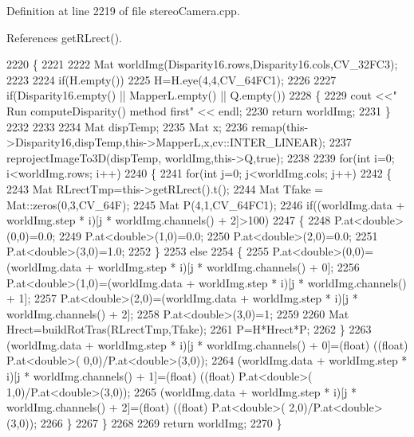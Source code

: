 Definition at line 2219 of file stereo\+Camera.\+cpp.



References get\+R\+Lrect().


\begin{DoxyCode}
2220 \{
2221 
2222     Mat worldImg(Disparity16.rows,Disparity16.cols,CV\_32FC3);
2223 
2224     \textcolor{keywordflow}{if}(H.empty())
2225         H=H.eye(4,4,CV\_64FC1);
2226 
2227     \textcolor{keywordflow}{if}(Disparity16.empty() || MapperL.empty() || Q.empty())
2228     \{
2229         cout <<\textcolor{stringliteral}{" Run computeDisparity() method first"} << endl;
2230         \textcolor{keywordflow}{return} worldImg;
2231     \}
2232 
2233 
2234     Mat dispTemp;
2235     Mat x;
2236     remap(this->Disparity16,dispTemp,this->MapperL,x,cv::INTER\_LINEAR);
2237     reprojectImageTo3D(dispTemp, worldImg,this->Q,\textcolor{keyword}{true});
2238 
2239     \textcolor{keywordflow}{for}(\textcolor{keywordtype}{int} i=0; i<worldImg.rows; i++)
2240     \{
2241         \textcolor{keywordflow}{for}(\textcolor{keywordtype}{int} j=0; j<worldImg.cols; j++)
2242         \{
2243             Mat RLrectTmp=this->getRLrect().t();
2244             Mat Tfake = Mat::zeros(0,3,CV\_64F);
2245             Mat P(4,1,CV\_64FC1);
2246             \textcolor{keywordflow}{if}((worldImg.data + worldImg.step * i)[j * worldImg.channels() + 2]>100)
2247             \{
2248                 P.at<\textcolor{keywordtype}{double}>(0,0)=0.0;
2249                 P.at<\textcolor{keywordtype}{double}>(1,0)=0.0;
2250                 P.at<\textcolor{keywordtype}{double}>(2,0)=0.0;
2251                 P.at<\textcolor{keywordtype}{double}>(3,0)=1.0;
2252             \}
2253             \textcolor{keywordflow}{else}
2254             \{
2255                 P.at<\textcolor{keywordtype}{double}>(0,0)=(worldImg.data + worldImg.step * i)[j * worldImg.channels() + 0];
2256                 P.at<\textcolor{keywordtype}{double}>(1,0)=(worldImg.data + worldImg.step * i)[j * worldImg.channels() + 1];
2257                 P.at<\textcolor{keywordtype}{double}>(2,0)=(worldImg.data + worldImg.step * i)[j * worldImg.channels() + 2];
2258                 P.at<\textcolor{keywordtype}{double}>(3,0)=1;
2259 
2260                 Mat Hrect=buildRotTras(RLrectTmp,Tfake);
2261                 P=H*Hrect*P;
2262             \}
2263             (worldImg.data + worldImg.step * i)[j * worldImg.channels() + 0]=(float) ((\textcolor{keywordtype}{float}) P.at<\textcolor{keywordtype}{double}>(
      0,0)/P.at<\textcolor{keywordtype}{double}>(3,0));
2264             (worldImg.data + worldImg.step * i)[j * worldImg.channels() + 1]=(float) ((\textcolor{keywordtype}{float}) P.at<\textcolor{keywordtype}{double}>(
      1,0)/P.at<\textcolor{keywordtype}{double}>(3,0));
2265             (worldImg.data + worldImg.step * i)[j * worldImg.channels() + 2]=(float) ((\textcolor{keywordtype}{float}) P.at<\textcolor{keywordtype}{double}>(
      2,0)/P.at<\textcolor{keywordtype}{double}>(3,0));
2266         \}
2267     \}
2268 
2269     \textcolor{keywordflow}{return} worldImg;
2270 \}
\end{DoxyCode}
